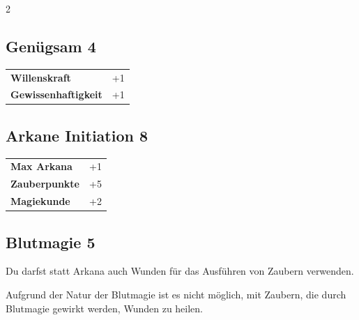 \begin{multicols}{2}
\begin{tcolorbox}
\end{tcolorbox}

\begin{tcolorbox}
    \subsection*{Genügsam \hfill \small{4 }}
    \tcblower




\begin{tabular}{@{}ll@{}}
    \textbf{Willenskraft} & +1\\
    \textbf{Gewissenhaftigkeit} & +1\\
\end{tabular}


\end{tcolorbox}

\begin{tcolorbox}
    \subsection*{Arkane Initiation \hfill \small{8 }}
    \tcblower




\begin{tabular}{@{}ll@{}}
    \textbf{Max Arkana} & +1\\
    \textbf{Zauberpunkte} & +5\\
    \textbf{Magiekunde} & +2\\
\end{tabular}


\end{tcolorbox}

\begin{tcolorbox}
    \subsection*{Blutmagie \hfill \small{5 }}
    \tcblower
Du darfst statt Arkana auch Wunden für das Ausführen von Zaubern verwenden.

Aufgrund der Natur der Blutmagie ist es nicht möglich, mit Zaubern, die durch Blutmagie gewirkt werden, Wunden zu heilen.



\end{tcolorbox}
\end{multicols}
